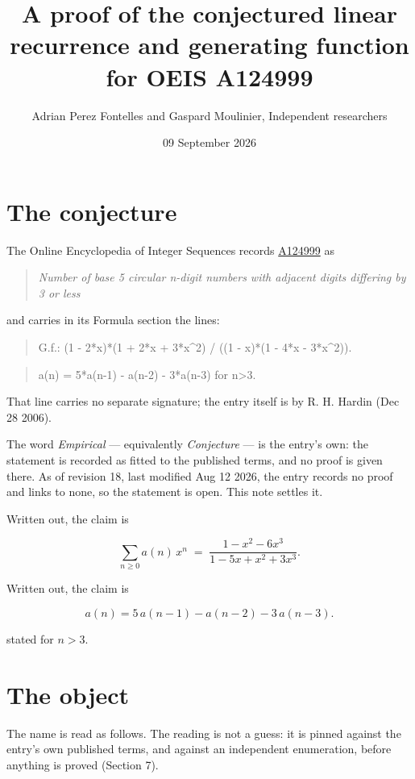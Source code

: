 \documentclass[11pt]{article}
\title{A proof of the conjectured linear recurrence and generating function for OEIS A124999}
\author{Adrian Perez Fontelles and Gaspard Moulinier, Independent researchers}
\date{09 September 2026}
\theoremstyle{definition}
\begin{document}
\maketitle
\section{The conjecture}

The Online Encyclopedia of Integer Sequences records \href{https://oeis.org/A124999}{A124999} as

\begin{quote}\itshape Number of base 5 circular n-digit numbers with adjacent digits differing by 3 or less\end{quote}

and carries in its Formula section the lines:

\begin{quote}\ttfamily G.f.: (1 - 2*x)*(1 + 2*x + 3*x\textasciicircum{}2) / ((1 - x)*(1 - 4*x - 3*x\textasciicircum{}2)).\end{quote}

\begin{quote}\ttfamily a(n) = 5*a(n-1) - a(n-2) - 3*a(n-3) for n>3.\end{quote}

That line carries no separate signature; the entry itself is by R. H. Hardin (Dec 28 2006).

The word {\itshape Empirical} --- equivalently {\itshape Conjecture} --- is the entry's own: the statement is recorded as fitted to the published terms, and no proof is given there. As of revision 18, last modified Aug 12 2026, the entry records no proof and links to none, so the statement is open. This note settles it.

Written out, the claim is

\[\sum_{n \ge 0} a(n)\,x^n \;=\; \frac{1 - x^{2} - 6x^{3}}{1 - 5x + x^{2} + 3x^{3}}.\]

Written out, the claim is

\[a(n) = 5\,a(n-1) - a(n-2) - 3\,a(n-3).\]

stated for $n > 3$.

\section{The object}

The name is read as follows. The reading is not a guess: it is pinned against the entry's own published terms, and against an independent enumeration, before anything is proved (Section 7).
\end{document}
